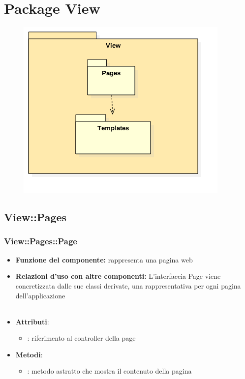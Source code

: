 \section{Package View}
\begin{figure}[h!]
\begin{center}
	\includegraphics[scale=0.7]{../images/ViewPackage.png}
\end{center}
\end{figure}

\subsection{View::Pages}
\subsubsection{View::Pages::Page}
\begin{itemize}
\item\textbf{Funzione del componente:} rappresenta una pagina web
				\item\textbf{Relazioni d'uso con altre componenti:} L'interfaccia Page viene concretizzata dalle sue classi derivate, una rappresentativa per ogni pagina dell'applicazione\\ \\
\item\textbf{Attributi}:
	\begin{itemize}
		\item{}: riferimento al controller della page\\
	\end{itemize}
\item\textbf{Metodi}:
	\begin{itemize}
		\item{}: metodo astratto che mostra il contenuto della pagina\\
	\end{itemize}
\end{itemize}


